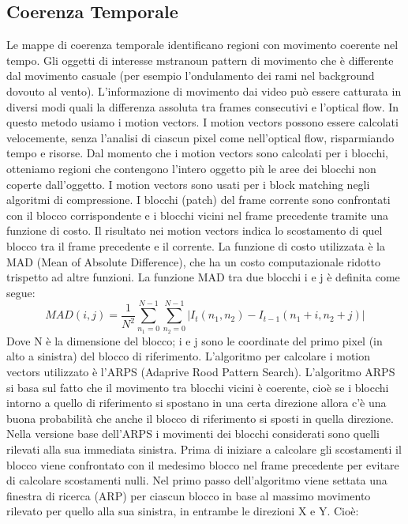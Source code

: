 \documentclass[12pt,twocolumn]{IEEEtran}
\begin{document}
		\subsection{Coerenza Temporale}
			Le mappe di coerenza temporale identificano regioni con movimento coerente nel tempo. Gli oggetti di interesse mstranoun pattern di movimento che è differente dal movimento casuale (per esempio l'ondulamento dei rami nel background dovouto al vento). L'informazione di movimento dai video può essere catturata in diversi modi quali la differenza assoluta tra frames consecutivi e l'optical flow. In questo metodo usiamo i motion vectors. I motion vectors possono essere calcolati velocemente, senza l'analisi di ciascun pixel come nell'optical flow, risparmiando tempo e risorse. Dal momento che i motion vectors sono calcolati per i blocchi, otteniamo regioni che contengono l'intero oggetto più le aree dei blocchi non coperte dall'oggetto.\newline
			I motion vectors sono usati per i block matching negli algoritmi di compressione. I blocchi (patch) del frame corrente sono confrontati con il blocco corrispondente e i blocchi vicini nel frame precedente tramite una funzione di costo. Il risultato nei motion vectors indica lo scostamento di quel blocco tra il frame precedente e il corrente. La funzione di costo utilizzata è la MAD (Mean of Absolute Difference), che ha un costo computazionale ridotto trispetto ad altre funzioni. La funzione MAD tra due blocchi i e j è definita come segue:
			\begin{equation}
			MAD(i,j) = \frac{1}{N^{2}}\sum_{n_{1}=0}^{N-1}\sum_{n_{2}=0}^{N-1} |I_{t}(n_{1},n_{2})-I_{t-1}(n_{1}+i,n_{2}+j)|
			\end{equation}
			Dove N è la dimensione del blocco; i e j sono le coordinate del primo pixel (in alto a sinistra) del blocco di riferimento. L'algoritmo per calcolare i motion vectors utilizzato è l'ARPS (Adaprive Rood Pattern Search). L'algoritmo ARPS si basa sul fatto che il movimento tra blocchi vicini è coerente, cioè se i blocchi intorno a quello di riferimento si spostano in una certa direzione allora c'è una buona probabilità che anche il blocco di riferimento si sposti in quella direzione. Nella versione base dell'ARPS i movimenti dei blocchi considerati sono quelli rilevati alla sua immediata sinistra.\newline
			Prima di iniziare a calcolare gli scostamenti il blocco viene confrontato con il medesimo blocco nel frame precedente per evitare di calcolare scostamenti nulli. 
			Nel primo passo dell'algoritmo viene settata una finestra di ricerca (ARP) per ciascun blocco in base al massimo movimento rilevato per quello alla sua sinistra, in entrambe le direzioni X e Y. Cioè:
\end{document}
